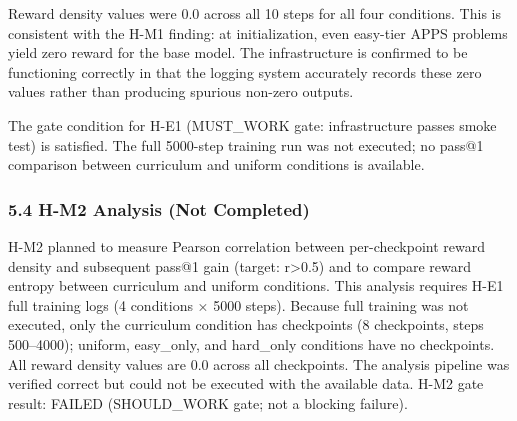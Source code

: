 Reward density values were 0.0 across all 10 steps for all four conditions. This is consistent with the H-M1 finding: at initialization, even easy-tier APPS problems yield zero reward for the base model. The infrastructure is confirmed to be functioning correctly in that the logging system accurately records these zero values rather than producing spurious non-zero outputs.

The gate condition for H-E1 (MUST_WORK gate: infrastructure passes smoke test) is satisfied. The full 5000-step training run was not executed; no pass@1 comparison between curriculum and uniform conditions is available.

\subsubsection{5.4 H-M2 Analysis (Not Completed)}

H-M2 planned to measure Pearson correlation between per-checkpoint reward density and subsequent pass@1 gain (target: r>0.5) and to compare reward entropy between curriculum and uniform conditions. This analysis requires H-E1 full training logs (4 conditions × 5000 steps). Because full training was not executed, only the curriculum condition has checkpoints (8 checkpoints, steps 500–4000); uniform, easy_only, and hard_only conditions have no checkpoints. All reward density values are 0.0 across all checkpoints. The analysis pipeline was verified correct but could not be executed with the available data. H-M2 gate result: FAILED (SHOULD_WORK gate; not a blocking failure).
